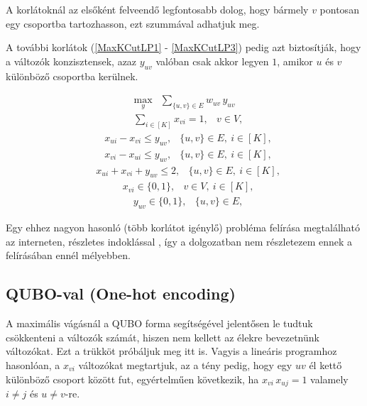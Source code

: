 A korlátoknál az elsőként felveendő legfontosabb dolog, hogy bármely $v$ pontosan egy csoportba tartozhasson, ezt  szummával adhatjuk meg.

A további korlátok (\ref{MaxKCutLP1} - \ref{MaxKCutLP3}) pedig azt biztosítják, hogy a változók konzisztensek, azaz $y_{uv}$ valóban csak akkor legyen $1$, amikor $u$ és $v$ különböző csoportba kerülnek.

\begin{align} \max _{y} &\sum _{\{{u,v}\} \in E} w_{uv} \, y_{uv}  \end{align}
\begin{align} &\sum _{i \in [K]} x_{vi} = 1,&v \in V, \label{sumMaxKCutLPEachNodeInOnePartition} \end{align}
\begin{align}&x_{ui} - x_{vi} \le y_{uv},&\{{u,v}\} \in E, \ i\in [K], \label{MaxKCutLP1} \end{align}
\begin{align}&x_{vi} - x_{ui} \le y_{uv},&\{{u,v}\} \in E, \ i\in [K], \end{align}
\begin{align}&x_{ui} + x_{vi} + y_{uv} \le 2,&\{{u,v}\} \in E, \ i\in [K], \label{MaxKCutLP3} \end{align}
\begin{align}&x_{vi} \in \{{0,1}\} ,&v \in V, \ i\in [K],\end{align}
\begin{align}&y_{uv} \in \{{0,1}\} ,&\{{u,v}\} \in E, \label{MaxKCutLP5} \end{align}

Egy ehhez nagyon hasonló (több korlátot igénylő) probléma felírása megtalálható az interneten, részletes indoklással \cite{Hojny2021}, így a dolgozatban nem részletezem ennek a felírásában ennél mélyebben. 

\subsection{QUBO-val (One-hot encoding)}\label{sec:QUBOonehot}


A maximális vágásnál a QUBO forma segítségével jelentősen le tudtuk csökkenteni a változók számát, hiszen nem kellett az élekre bevezetnünk változókat. Ezt a trükköt próbáljuk meg itt is.
Vagyis a lineáris programhoz hasonlóan, a $x_{vi}$ változókat megtartjuk, az a tény pedig, hogy egy $uv$ él kettő különböző csoport között fut, egyértelműen következik, ha $x_{vi} \, x_{uj}=1$ valamely $i \neq j$ és $u \neq v$-re.

